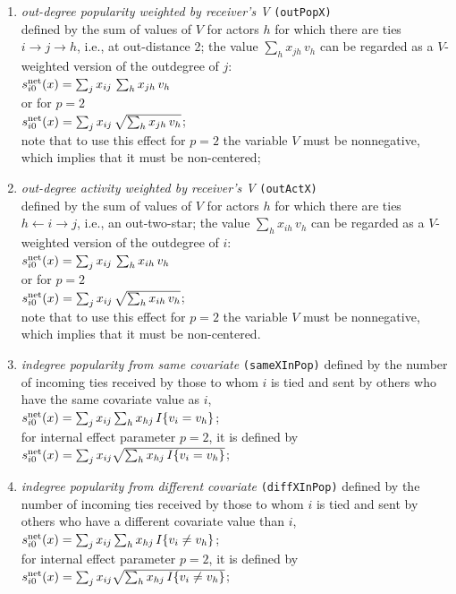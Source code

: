 \documentclass[a4paper,fleqn,11pt]{article}
\newcommand{\+}{\, + \,}
\newcommand{\vit}{\theenumi}
\begin{document}
\begin{enumerate}
 \item {\em out-degree popularity weighted by receiver's V }  \texttt{(outPopX)}\\
 defined by the sum of values of $V$ for actors $h$
 for which there are ties  $ i \rightarrow j \rightarrow h$,
 i.e., at out-distance 2;
 the value $\sum_h x_{jh}\,v_h$ can be regarded as a $V$-weighted
 version of the outdegree of $j$:\\
 $s^{\rm net}_{i\vit}(x) =  \sum_j x_{ij}\, \sum_h x_{jh}\,v_h  $ \\
 or for $p=2$ \\
   $s^{\rm net}_{i\vit}(x) =  \sum_j x_{ij}\, \sqrt{\sum_h x_{jh}\,v_h}   $;\\
 note that to use this effect for $p=2$ the variable $V$ must be nonnegative,
 which implies that it must be non-centered;

 \item {\em out-degree activity weighted by receiver's V }   \texttt{(outActX)}\\
 defined by the sum of values of $V$ for actors $h$
 for which there are ties  $h \leftarrow i \rightarrow j$,
 i.e., an out-two-star;
 the value $\sum_h x_{ih}\,v_h$ can be regarded as a $V$-weighted
 version of the outdegree of $i$:\\
 $s^{\rm net}_{i\vit}(x) =  \sum_j x_{ij}\, \sum_h x_{ih}\,v_h  $ \\
 or for $p=2$ \\
   $s^{\rm net}_{i\vit}(x) =  \sum_j x_{ij}\, \sqrt{\sum_h x_{ih}\,v_h}   $;\\
 note that to use this effect for $p=2$ the variable $V$ must be nonnegative,
 which implies that it must be non-centered.

 \item {\em indegree popularity from same covariate}
\texttt{(sameXInPop)} defined by the
 number of incoming ties received by those to whom $i$ is tied
 and sent by others who have the same covariate value as $i$,\\
 $s^{\rm net}_{i\vit}(x) = \sum_j x_{ij} \sum_h x_{hj}\, I\{v_i = v_h \} $;\\
 for internal effect parameter $p=2$, it is defined by\\
 $s^{\rm net}_{i\vit}(x) = \sum_j x_{ij} \sqrt{\sum_h x_{hj}\, I\{v_i = v_h \}} $;\\

 \item {\em indegree popularity from different covariate}
\texttt{(diffXInPop)} defined by the
 number of incoming ties received by those to whom $i$ is tied
 and sent by others who have a different covariate value than $i$,\\
 $s^{\rm net}_{i\vit}(x) = \sum_j x_{ij} \sum_h x_{hj}\, I\{v_i \neq v_h \} $;\\
 for internal effect parameter $p=2$, it is defined by\\
 $s^{\rm net}_{i\vit}(x) = \sum_j x_{ij} \sqrt{\sum_h x_{hj}\, I\{v_i \neq v_h \}} $;\\


\end{enumerate}
\end{document}
